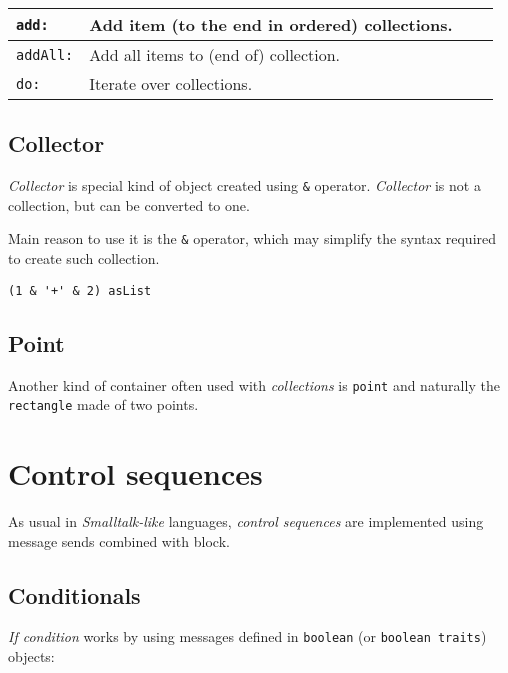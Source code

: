 \documentclass[10pt]{article}
\begin{document}
\begin{multicols*}{3}
{\begin{tabular}{ p{50pt} p{180pt} l l }
\texttt{add:}
&
Add item (to the end in ordered) collections.
\\\hline %

\texttt{addAll:}
&
Add all items to (end of) collection.
\\\hline %

\texttt{do:}
&
Iterate over collections.
\\ %
\end{tabular}}



\subsection{Collector}
\textit{Collector} is special kind of object created using \texttt{\&} operator. \textit{Collector} is not a collection, but can be converted to one.

Main reason to use it is the \texttt{\&} operator, which may simplify the syntax required to create such collection.

\nointerlineskip\begin{lstlisting}
(1 & '+' & 2) asList
\end{lstlisting}\nointerlineskip



\subsection{Point}
Another kind of container often used with \textit{collections} is \texttt{point} and naturally the \texttt{rectangle} made of two points.




\vfill
\columnbreak
\section{Control sequences}
As usual in \textit{Smalltalk-like} languages, \textit{control sequences} are implemented using message sends combined with block.



\subsection{Conditionals}
\textit{If condition} works by using messages defined in \texttt{boolean} (or \texttt{boolean traits}) objects:


\end{multicols*}
\end{document}
